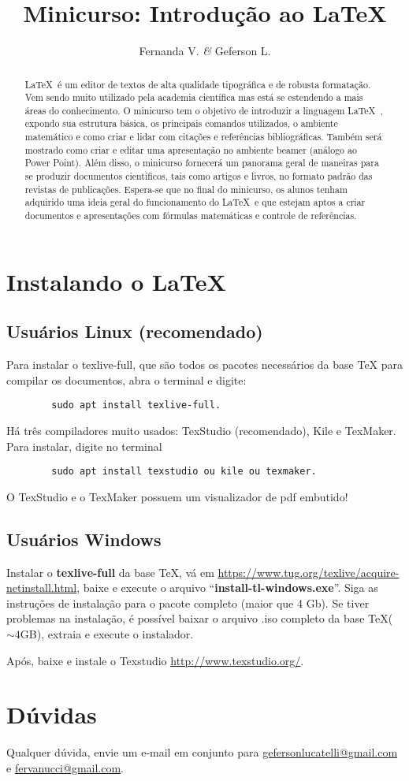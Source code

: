 \documentclass[12pt,a4paper]{article}
\author{Fernanda V. \emph{\&} Geferson L.}
\title{Minicurso: Introdução ao \LaTeX}
\begin{document}
\maketitle
\begin{abstract}
					\LaTeX\ é um editor de textos de alta qualidade tipográfica e de robusta formatação. 
					Vem sendo muito utilizado pela academia científica mas está se estendendo 
					a mais áreas do conhecimento. O minicurso tem o objetivo de introduzir 
					a linguagem \LaTeX\ , expondo sua estrutura básica, os 
					principais comandos utilizados, o ambiente matemático e como criar e  
					lidar com citações e referências bibliográficas. Também será mostrado como criar e 
					editar uma apresentação no ambiente beamer (análogo ao Power Point). 
					Além disso, o minicurso fornecerá um
					panorama geral de maneiras para se produzir documentos científicos, tais como artigos e livros, 
					no formato padrão das revistas de publicações.
					Espera-se que no final do 
					minicurso, os alunos tenham adquirido uma ideia geral do funcionamento do \LaTeX\ 
					e que estejam aptos a criar documentos e apresentações com fórmulas 
					matemáticas e controle de referências.
\end{abstract}
\section*{Instalando o \LaTeX}
\subsection*{Usuários Linux (recomendado)}
		 Para instalar o texlive-full, que são todos os pacotes necessários da base \TeX 
		 para compilar os documentos, abra o terminal e digite: 
		\begin{verbatim}
		sudo apt install texlive-full.
		\end{verbatim}
		Há três compiladores muito usados:  TexStudio (recomendado), Kile e  TexMaker. Para 
		instalar, digite no terminal
		\begin{verbatim}
		sudo apt install texstudio ou kile ou texmaker.
		\end{verbatim}
		O TexStudio e o TexMaker possuem um visualizador de pdf embutido! 
		
\subsection*{Usuários Windows}
Instalar o {\bf texlive-full} da base \TeX, vá em \url{https://www.tug.org/texlive/acquire-netinstall.html},
baixe e execute o arquivo ``{\bf install-tl-windows.exe}''. Siga as instruções de instalação para o 
pacote completo (maior que 4 Gb). Se tiver problemas na instalação, é possível baixar o arquivo .iso 
completo da base \TeX ($\sim 4$GB), extraia e execute o instalador. 

Após, baixe e instale o Texstudio \url{http://www.texstudio.org/}.

\section*{Dúvidas}
Qualquer dúvida, envie um e-mail em conjunto para \underline{gefersonlucatelli@gmail.com} 
e \underline{fervanucci@gmail.com}.
\end{document}
